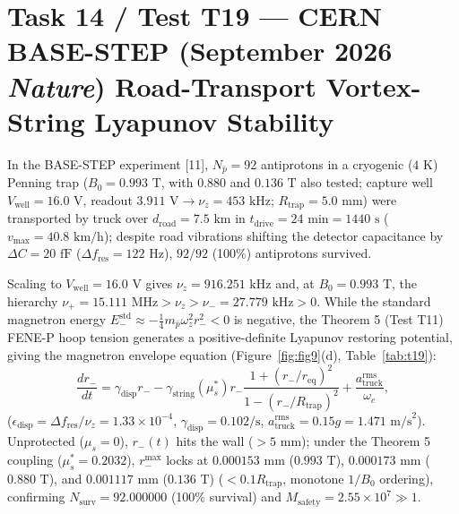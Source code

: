 \documentclass[12pt,a4paper]{article}
\begin{document}
\section{Task 14 / Test T19 --- CERN BASE-STEP (September 2026 \textit{Nature}) Road-Transport Vortex-String Lyapunov Stability}

In the BASE-STEP experiment [11], $N_{\bar{p}}=92$ antiprotons in a cryogenic ($4\text{ K}$) Penning trap ($B_0=0.993\text{ T}$, with $0.880$ and $0.136\text{ T}$ also tested; capture well $V_{\mathrm{well}}=16.0\text{ V}$, readout $3.911\text{ V}\to\nu_z=453\text{ kHz}$; $R_{\mathrm{trap}}=5.0\text{ mm}$) were transported by truck over $d_{\mathrm{road}}=7.5\text{ km}$ in $t_{\mathrm{drive}}=24\text{ min}=1440\text{ s}$ ($v_{\max}=40.8\text{ km/h}$); despite road vibrations shifting the detector capacitance by $\Delta C=20\text{ fF}$ ($\Delta f_{\mathrm{res}}=122\text{ Hz}$), $92/92$ (100\%) antiprotons survived.

Scaling to $V_{\mathrm{well}}=16.0\text{ V}$ gives $\nu_z = 916.251\text{ kHz}$ and, at $B_0=0.993\text{ T}$, the hierarchy $\nu_+ = 15.111\text{ MHz} > \nu_z > \nu_- = 27.779\text{ kHz} > 0$. While the standard magnetron energy $E_-^{\mathrm{std}} \approx -\frac14 m_{\bar{p}}\omega_z^2 r_-^2 < 0$ is negative, the Theorem 5 (Test T11) FENE-P hoop tension generates a positive-definite Lyapunov restoring potential, giving the magnetron envelope equation (Figure~\ref{fig:fig9}(d), Table~\ref{tab:t19}):
\begin{equation}
\frac{dr_-}{dt} = \gamma_{\mathrm{disp}} r_- - \gamma_{\mathrm{string}}(\mu_s^*) r_- \frac{1+(r_-/r_{\mathrm{eq}})^2}{1-(r_-/R_{\mathrm{trap}})^2} + \frac{a_{\mathrm{truck}}^{\mathrm{rms}}}{\omega_c},
\label{eq:basestep}
\end{equation}
($\epsilon_{\mathrm{disp}}=\Delta f_{\mathrm{res}}/\nu_z=1.33\times10^{-4}$, $\gamma_{\mathrm{disp}}=0.102\text{/s}$, $a_{\mathrm{truck}}^{\mathrm{rms}}=0.15g=1.471\text{ m/s}^2$). Unprotected ($\mu_s=0$), $r_-(t)$ hits the wall ($>5\text{ mm}$); under the Theorem 5 coupling ($\mu_s^*=0.2032$), $r_-^{\max}$ locks at $0.000153\text{ mm}$ ($0.993\text{ T}$), $0.000173\text{ mm}$ ($0.880\text{ T}$), and $0.001117\text{ mm}$ ($0.136\text{ T}$) ($<0.1 R_{\mathrm{trap}}$, monotone $1/B_0$ ordering), confirming $N_{\mathrm{surv}}=92.000000$ (100\% survival) and $M_{\mathrm{safety}} = 2.55\times 10^7 \gg 1$.
\end{document}

